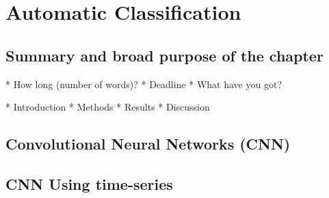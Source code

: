 
\chapter{Automatic Classification}

\ifpdf
    \graphicspath{{chapter5/figs/raster/}{chapter5/figs/PDF/}{chapter5/figs/}}
\else
    \graphicspath{{chapter5/figs/vector/}{chapter5/figs/}}
\fi

\section*{Summary and broad purpose of the chapter}
* How long (number of words)?
* Deadline
* What have you got?

* Introduction
* Methods
* Results
* Discussion


\section{Convolutional Neural Networks (CNN)}
\lipsum[1-4]

\section{CNN Using time-series}

